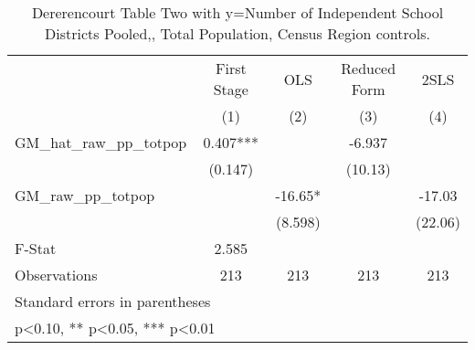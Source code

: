 \begin{table}[htbp]\centering
\def\sym#1{\ifmmode^{#1}\else\(^{#1}\)\fi}
\caption{Dererencourt Table Two with y=Number of Independent School Districts  Pooled,, Total Population, Census Region controls.}
\begin{tabular}{l*{4}{c}}
\toprule
                    & First Stage   &         OLS   &Reduced Form   &        2SLS   \\
                    &\multicolumn{1}{c}{(1)}   &\multicolumn{1}{c}{(2)}   &\multicolumn{1}{c}{(3)}   &\multicolumn{1}{c}{(4)}   \\
\midrule
GM\_hat\_raw\_pp\_totpop&       0.407***&               &      -6.937   &               \\
                    &     (0.147)   &               &     (10.13)   &               \\
\addlinespace
GM\_raw\_pp\_totpop    &               &      -16.65*  &               &      -17.03   \\
                    &               &     (8.598)   &               &     (22.06)   \\
\midrule
F-Stat              &       2.585   &               &               &               \\
Observations        &         213   &         213   &         213   &         213   \\
\bottomrule
\multicolumn{5}{l}{\footnotesize Standard errors in parentheses}\\
\multicolumn{5}{l}{\footnotesize * p<0.10, ** p<0.05, *** p<0.01}\\
\end{tabular}
\end{table}
